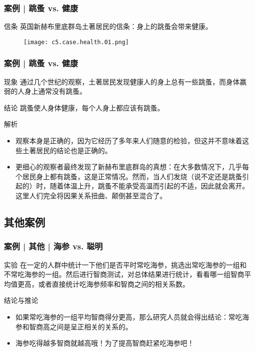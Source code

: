\begin{frame}
  \frametitle{案例 | 跳蚤 vs. 健康}
  \begin{block}{信条}
    英国新赫布里底群岛土著居民的信条：身上的跳蚤会带来健康。
  \end{block}
  \begin{figure}
    \centering
    \texttt{[image: c5.case.health.01.png]}
  \end{figure}
\end{frame}

\begin{frame}
  \frametitle{案例 | 跳蚤 vs. 健康}
  \begin{block}{现象}
    通过几个世纪的观察，土著居民发现健康人的身上总有一些跳蚤，而身体羸弱的人身上通常没有跳蚤。
  \end{block}
  \pause
  \begin{block}{结论}
    跳蚤使人身体健康，每个人身上都应该有跳蚤。
  \end{block}
  \pause
  \begin{block}{解析}
    \begin{itemize}
      \item 观察本身是正确的，因为它经历了多年来人们随意的检验，但这并不意味着这些土著居民的结论也是正确的。
      \item 更细心的观察者最终发现了新赫布里底群岛的真想：在大多数情况下，几乎每个居民身上都有跳蚤，这是正常情况。然而，当人们发烧（说不定还是跳蚤引起的）时，随着体温上升，跳蚤不能承受高温而引起的不适，因此就会离开。这里人们完全将因果关系扭曲、颠倒甚至混合了。
    \end{itemize}
  \end{block}
\end{frame}

\subsection{其他案例}
\begin{frame}
  \frametitle{案例 | 其他 | 海参 vs. 聪明}
  \begin{block}{实验}
在一定的人群中统计一下他们是否平时常吃海参，挑选出常吃海参的一组和不常吃海参的一组。然后进行智商测试，对总体结果进行统计，看看哪一组智商平均值更高，或者直接统计吃海参频率和智商之间的相关系数。
  \end{block}
  \pause
  \begin{block}{结论与推论}
    \begin{itemize}
      \item 如果常吃海参的一组平均智商得分更高，那么研究人员就会得出结论：常吃海参和智商高之间是呈正相关的关系的。
      \item 海参吃得越多智商就越高哦！为了提高智商赶紧吃海参吧！
    \end{itemize}
  \end{block}
\end{frame}

